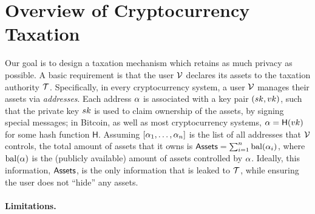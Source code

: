 \section{Overview of Cryptocurrency Taxation}\label{sec:taxation}

Our goal is to design a taxation mechanism which retains as much privacy as
possible. A basic requirement is that the user $\mathcal{V}$ declares its assets to
the taxation authority $\mathcal{T}$.  Specifically, in every cryptocurrency
system, a user $\mathcal{V}$ manages their assets via \emph{addresses}. Each address
$\alpha$ is associated with a key pair $(sk, vk)$, such that the private key
$sk$ is used to claim ownership of the assets, \eg by signing special
messages; in Bitcoin, as well as most cryptocurrency systems, $\alpha =
\mathsf{H}(vk)$ for some hash function $\mathsf{H}$. Assuming
$[\alpha_1, \dots, \alpha_n]$ is the list of all addresses that $\mathcal{V}$
controls, the total amount of assets that it owns is $\mathsf{Assets} = \sum_{i=1}^n
\text{bal}(\alpha_i)$, where $\text{bal}(\alpha)$ is the (publicly available)
amount of assets controlled by $\alpha$.  Ideally, this information, \ie
$\mathsf{Assets}$, is the only information that is leaked to $\mathcal{T}$, while ensuring
the user does not ``hide'' any assets.

\paragraph{Limitations.}\label{subsec:limitations}

